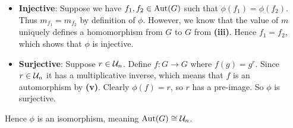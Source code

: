 \begin{questions}
\begin{partquestions}{\roman*}
\begin{itemize}
            \item \textbf{Injective}: Suppose we have $f_1, f_2 \in \mathrm{Aut}(G)$ such that $\phi(f_1) = \phi(f_2)$. Thus $m_{f_1} = m_{f_2}$ by definition of $\phi$. However, we know that the value of $m$ uniquely defines a homomorphism from $G$ to $G$ from \textbf{(iii)}. Hence $f_1 = f_2$, which shows that $\phi$ is injective.
            
            \item \textbf{Surjective}: Suppose $r \in \mathcal{U}_{n}$. Define $f: G \to G$ where $f(g) = g^r$. Since $r \in \mathcal{U}_{n}$ it has a multiplicative inverse, which means that $f$ is an automorphism by \textbf{(v)}. Clearly $\phi(f) = r$, so $r$ has a pre-image. So $\phi$ is surjective.
        \end{itemize}
        Hence $\phi$ is an isomorphism, meaning $\mathrm{Aut}(G) \cong \mathcal{U}_{n}$.
    \end{partquestions}
\end{questions}
